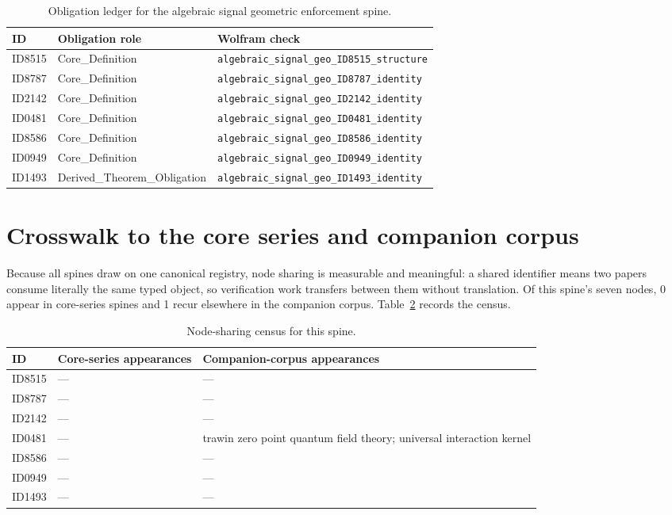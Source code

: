 \documentclass[11pt]{article}
\theoremstyle{remark}
\begin{document}
\begin{table}[ht]
\centering
\small
\caption{Obligation ledger for the algebraic signal geometric enforcement spine.}
\label{tab:obligations}
\begin{tabular}{llp{6.2cm}}
\toprule
ID & Obligation role & Wolfram check \\
\midrule
ID8515 & Core\_Definition & \texttt{algebraic\_signal\_geo\_ID8515\_structure} \\
ID8787 & Core\_Definition & \texttt{algebraic\_signal\_geo\_ID8787\_identity} \\
ID2142 & Core\_Definition & \texttt{algebraic\_signal\_geo\_ID2142\_identity} \\
ID0481 & Core\_Definition & \texttt{algebraic\_signal\_geo\_ID0481\_identity} \\
ID8586 & Core\_Definition & \texttt{algebraic\_signal\_geo\_ID8586\_identity} \\
ID0949 & Core\_Definition & \texttt{algebraic\_signal\_geo\_ID0949\_identity} \\
ID1493 & Derived\_Theorem\_Obligation & \texttt{algebraic\_signal\_geo\_ID1493\_identity} \\
\bottomrule
\end{tabular}
\end{table}

\section{Crosswalk to the core series and companion corpus}
\label{sec:crosswalk}

Because all spines draw on one canonical registry, node sharing is measurable and meaningful: a shared identifier means two papers consume literally the same typed object, so verification work transfers between them without translation. Of this spine's seven nodes, 0 appear in core-series spines and 1 recur elsewhere in the companion corpus. Table~\ref{tab:crosswalk} records the census.

\begin{table}[ht]
\centering
\small
\caption{Node-sharing census for this spine.}
\label{tab:crosswalk}
\begin{tabular}{lp{4.4cm}p{6.6cm}}
\toprule
ID & Core-series appearances & Companion-corpus appearances \\
\midrule
ID8515 & --- & --- \\
ID8787 & --- & --- \\
ID2142 & --- & --- \\
ID0481 & --- & trawin zero point quantum field theory; universal interaction kernel \\
ID8586 & --- & --- \\
ID0949 & --- & --- \\
ID1493 & --- & --- \\
\bottomrule
\end{tabular}
\end{table}
\end{document}
